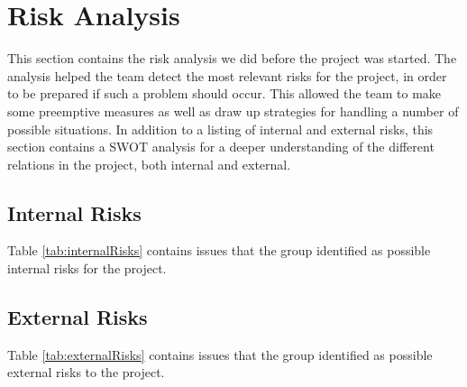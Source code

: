 \section{Risk Analysis}
This section contains the risk analysis we did before the project was started. The 
analysis helped the team detect the most relevant risks for the project, in order 
to be prepared if such a problem should occur. This allowed the team to make some preemptive 
measures as well as draw up strategies for handling a number of possible situations. 
In addition to a listing of internal and external risks, this section contains a SWOT 
analysis for a deeper understanding of the different relations in the project, both internal and external.

\subsection{Internal Risks}
Table \ref{tab:internalRisks} contains issues that the group identified as possible 
internal risks for the project.

\subsection{External Risks}
Table \ref{tab:externalRisks} contains issues that the group identified as possible external 
risks to the project.

